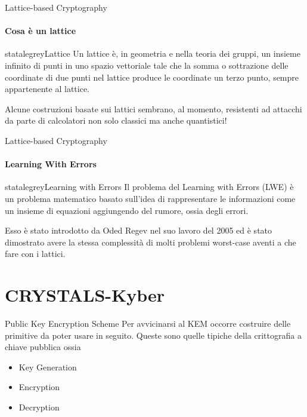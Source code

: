 \begin{frame}{Lattice-based Cryptography}
    \framesubtitle{Cosa è un lattice}

    \begin{colorblock}[black]{statalegrey}{Lattice}
Un lattice è, in geometria e nella teoria dei gruppi, un insieme infinito di punti in uno spazio vettoriale tale che la somma o sottrazione delle coordinate di due punti nel lattice produce le coordinate un terzo punto, sempre appartenente al lattice.
    \end{colorblock}

Alcune costruzioni basate sui lattici sembrano, al momento, resistenti ad attacchi da parte di calcolatori non solo classici ma anche quantistici!

\end{frame}
\begin{frame}{Lattice-based Cryptography}
\framesubtitle{Learning With Errors}

    \begin{colorblock}[black]{statalegrey}{Learning with Errors}
Il problema del Learning with Errors (LWE) è un problema matematico basato sull'idea di rappresentare le informazioni come un insieme di equazioni aggiungendo del rumore, ossia degli errori.
    \end{colorblock}
Esso è stato introdotto da Oded Regev nel suo lavoro del 2005 ed è stato dimostrato avere la stessa complessità di molti problemi worst-case aventi a che fare con i lattici.
\end{frame}

\section{CRYSTALS-Kyber}

\begin{frame}{Public Key Encryption Scheme}
Per avvicinarsi al KEM occorre costruire delle primitive da poter usare in seguito. Queste sono quelle tipiche della crittografia a chiave pubblica ossia\begin{itemize}
    \item Key Generation
    \item Encryption
    \item Decryption
\end{itemize}
\end{frame}

